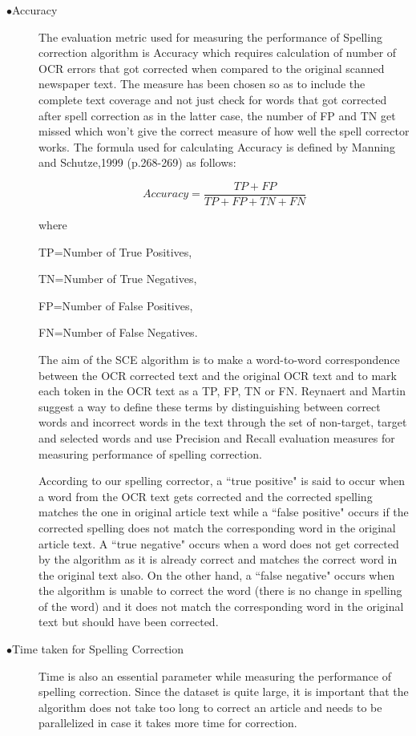 \documentclass[letterpaper,11pt]{report}
\begin{document}
\begin{description}

 \item[$\bullet$Accuracy]
 The evaluation metric used for measuring the performance of Spelling correction algorithm is Accuracy which requires calculation of number of OCR errors that got corrected when compared to the original scanned newspaper text. The measure has been chosen so as to include the complete text coverage and not just check for words that got corrected after spell correction as in the latter case, the  number of FP and TN get missed which won't give the correct measure of how well the spell corrector works. The formula used for calculating Accuracy is defined by Manning and Schutze,1999 (p.268-269) as follows:

$$Accuracy=  \dfrac{TP+FP} {TP+ FP + TN + FN}$$


where 

TP=Number of True Positives,

TN=Number of True Negatives,

 FP=Number of False Positives,

 FN=Number of False Negatives. 

The aim of the SCE algorithm is to make a word-to-word correspondence between the OCR corrected text and the original OCR text and to mark each token in the OCR text as a TP, FP, TN or FN. Reynaert and Martin\cite{reynaert2008all} suggest a way to define these terms by distinguishing between correct words and incorrect words in the text through the set of non-target, target and selected words and use Precision and Recall evaluation measures for measuring performance of spelling correction. 

According to our spelling corrector, a ``true positive" is said to occur when a word from the OCR text gets corrected and the corrected spelling matches the one in original article text while a ``false positive" occurs if the corrected spelling does not match the corresponding word in the original article text. A ``true negative" occurs when a word does not get corrected by the algorithm as it is already correct and matches the correct word in the original text also. On the other hand, a ``false negative" occurs when the algorithm is unable to correct the word (there is no change in spelling of the word) and it does not match the corresponding word in the original text but should have been corrected.



\item[$\bullet$Time taken for Spelling Correction]
Time is also an essential parameter while measuring the performance of spelling correction. Since the dataset is quite large, it is important that the algorithm does not take too long to correct an article and needs to be parallelized in case it takes more time for correction.



\end{description}
\end{document}
